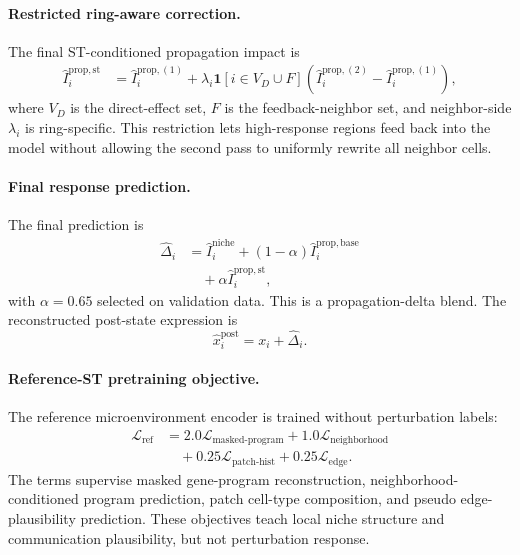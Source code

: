 \documentclass[sigconf,anonymous,review]{acmart}
\begin{document}
\paragraph{Restricted ring-aware correction.}
The final ST-conditioned propagation impact is
\[
\begin{aligned}
\widehat I_i^{\mathrm{prop},\mathrm{st}}
&=
\widehat I_i^{\mathrm{prop},(1)}
+
\lambda_i
\mathbf 1[i\in V_D\cup F]
\left(
\widehat I_i^{\mathrm{prop},(2)}-\widehat I_i^{\mathrm{prop},(1)}
\right),
\end{aligned}
\]
where $V_D$ is the direct-effect set, $F$ is the feedback-neighbor set, and neighbor-side $\lambda_i$ is ring-specific. This restriction lets high-response regions feed back into the model without allowing the second pass to uniformly rewrite all neighbor cells.

\paragraph{Final response prediction.}
The final prediction is
\[
\begin{aligned}
\widehat\Delta_i
&=
\widehat I_i^{\mathrm{niche}}
+
(1-\alpha)\widehat I_i^{\mathrm{prop},\mathrm{base}}
\\
&\quad +
\alpha\widehat I_i^{\mathrm{prop},\mathrm{st}},
\end{aligned}
\]
with $\alpha=0.65$ selected on validation data. This is a propagation-delta blend. The reconstructed post-state expression is
\[
\widehat x_i^{\mathrm{post}}
=
x_i+\widehat\Delta_i.
\]

\paragraph{Reference-ST pretraining objective.}
The reference microenvironment encoder is trained without perturbation labels:
\[
\begin{aligned}
\mathcal L_{\mathrm{ref}}
&=
2.0\mathcal L_{\mathrm{masked\text{-}program}}
+
1.0\mathcal L_{\mathrm{neighborhood}}
\\
&\quad +
0.25\mathcal L_{\mathrm{patch\text{-}hist}}
+
0.25\mathcal L_{\mathrm{edge}}.
\end{aligned}
\]
The terms supervise masked gene-program reconstruction, neighborhood-conditioned program prediction, patch cell-type composition, and pseudo edge-plausibility prediction. These objectives teach local niche structure and communication plausibility, but not perturbation response.
\end{document}
